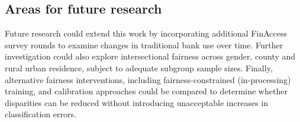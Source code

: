 \documentclass[11pt,a4paper]{article}
\begin{document}
\subsection{Areas for future research}

Future research could extend this work by incorporating additional
FinAccess survey rounds to examine changes in traditional bank use
over time. Further investigation could also explore intersectional
fairness across gender, county and rural urban residence, subject
to adequate subgroup sample sizes. Finally, alternative fairness
interventions, including fairness-constrained (in-processing) training, and calibration approaches could be compared to
determine whether disparities can be reduced without introducing
unacceptable increases in classification errors.
\end{document}
